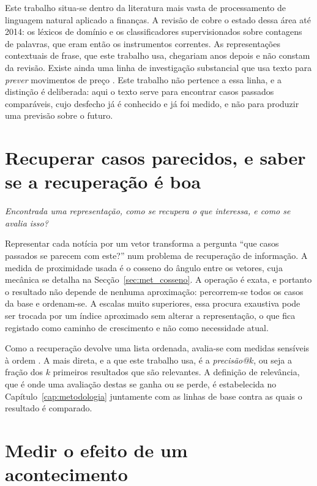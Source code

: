 Este trabalho situa-se dentro da literatura mais vasta de processamento de linguagem natural
aplicado a finanças. A revisão de \textcite{kearney2014textual} cobre o estado dessa área até 2014:
os léxicos de domínio e os classificadores supervisionados sobre contagens de palavras, que eram
então os instrumentos correntes. As representações contextuais de frase, que este trabalho usa,
chegariam anos depois e não constam da revisão. Existe ainda uma linha de investigação substancial que usa texto para \emph{prever}
movimentos de preço \autocite{xing2018nlffsurvey, ding2015deep}. Este trabalho não pertence a essa
linha, e a distinção é deliberada: aqui o texto serve para encontrar casos passados comparáveis,
cujo desfecho já é conhecido e já foi medido, e não para produzir uma previsão sobre o futuro.

\section{Recuperar casos parecidos, e saber se a recuperação é boa}
\label{sec:ctx_recuperacao}

\emph{Encontrada uma representação, como se recupera o que interessa, e como se avalia isso?}

Representar cada notícia por um vetor transforma a pergunta ``que casos passados se parecem com
este?'' num problema de recuperação de informação. A medida de proximidade usada é o cosseno do
ângulo entre os vetores, cuja mecânica se detalha na Secção~\ref{sec:met_cosseno}. A operação é
exata, e portanto o resultado não depende de nenhuma aproximação: percorrem-se todos os casos da
base e ordenam-se. A escalas muito superiores, essa procura exaustiva pode ser trocada por um índice
aproximado \autocite{johnson2021faiss} sem alterar a representação, o que fica registado como
caminho de crescimento e não como necessidade atual.

Como a recuperação devolve uma lista ordenada, avalia-se com medidas sensíveis à ordem
\autocite{manning2008ir}. A mais direta, e a que este trabalho usa, é a \emph{precisão@$k$}, ou seja
a fração dos $k$ primeiros resultados que são relevantes. A definição de relevância, que é onde uma
avaliação destas se ganha ou se perde, é estabelecida no Capítulo~\ref{cap:metodologia} juntamente com as
linhas de base contra as quais o resultado é comparado.

\section{Medir o efeito de um acontecimento}
\label{sec:ctx_evento}

